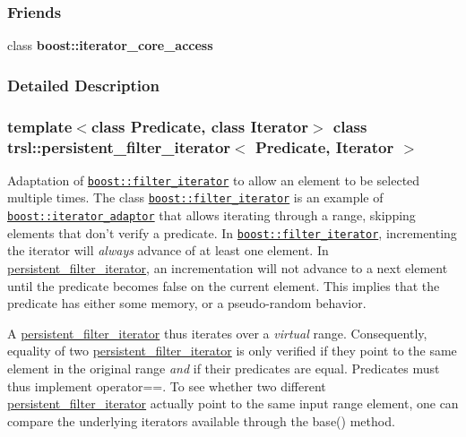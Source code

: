 \subsubsection*{Friends}
\begin{DoxyCompactItemize}
\item 
\hypertarget{classtrsl_1_1persistent__filter__iterator_ac09f73e325921cc50ebcd96bed0f8096}{
class {\bfseries boost::iterator\_\-core\_\-access}}
\label{classtrsl_1_1persistent__filter__iterator_ac09f73e325921cc50ebcd96bed0f8096}

\end{DoxyCompactItemize}


\subsubsection{Detailed Description}
\subsubsection*{template$<$class Predicate, class Iterator$>$ class trsl::persistent\_\-filter\_\-iterator$<$ Predicate, Iterator $>$}

Adaptation of \href{http://www.boost.org/libs/iterator/doc/filter_iterator.html}{\tt boost::filter\_\-iterator} to allow an element to be selected multiple times. The class \href{http://www.boost.org/libs/iterator/doc/filter_iterator.html}{\tt boost::filter\_\-iterator} is an example of \href{http://www.boost.org/libs/iterator/doc/iterator_adaptor.html}{\tt boost::iterator\_\-adaptor} that allows iterating through a range, skipping elements that don't verify a predicate. In \href{http://www.boost.org/libs/iterator/doc/filter_iterator.html}{\tt boost::filter\_\-iterator}, incrementing the iterator will {\itshape always\/} advance of at least one element. In \hyperlink{classtrsl_1_1persistent__filter__iterator}{persistent\_\-filter\_\-iterator}, an incrementation will not advance to a next element until the predicate becomes false on the current element. This implies that the predicate has either some memory, or a pseudo-\/random behavior.

A \hyperlink{classtrsl_1_1persistent__filter__iterator}{persistent\_\-filter\_\-iterator} thus iterates over a {\itshape virtual\/} range. Consequently, equality of two \hyperlink{classtrsl_1_1persistent__filter__iterator}{persistent\_\-filter\_\-iterator} is only verified if they point to the same element in the original range {\itshape and\/} if their predicates are equal. Predicates must thus implement {\ttfamily operator==}. To see whether two different \hyperlink{classtrsl_1_1persistent__filter__iterator}{persistent\_\-filter\_\-iterator} actually point to the same input range element, one can compare the underlying iterators available through the {\ttfamily base()} method.

